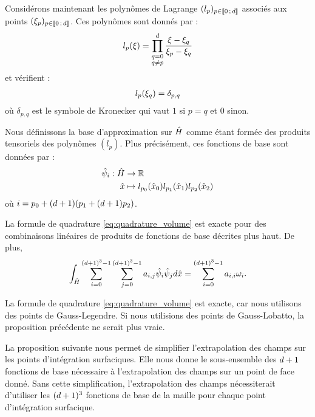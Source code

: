 Considérons maintenant les polynômes de Lagrange $(l_p)_{p \in \lbrack\!\lbrack0\,;\,d\rbrack\!\rbrack}$
associés aux points $(\xi_p)_{p \in \lbrack\!\lbrack0\,;\,d\rbrack\!\rbrack}$.
Ces polynômes sont donnés par :
\begin{align}
	l_p(\xi) = \prod_{\substack{q=0 \\ q \ne p}}^{d}
	\frac{\xi - \xi_q}{\xi_p - \xi_q}
\end{align}
et vérifient :
\begin{align}
	l_p(\xi_q) = \delta_{p,q}
\end{align}
où $\delta_{p,q}$ est le symbole de Kronecker qui vaut $1$ si $p = q$
et $0$ sinon.


Nous définissons la base d’approximation sur $\hat{H}$ comme étant formée des
produits tensoriels des polynômes $(l_p)$. Plus précisément, ces fonctions
de base sont données par :
\begin{equation}
	\begin{aligned}
		\hat{\psi}_{i} : \hat{H} &\to \mathbb{R} \\
		\hat{x} &\mapsto
		l_{p_{0}}(\hat{x}_0)
		l_{p_{1}}(\hat{x}_1)
		l_{p_{2}}(\hat{x}_2)
	\end{aligned}
\end{equation}
où $i = {p_{0}} + (d + 1)({p_{1}} + (d + 1){p_{2}})$.

\begin{proposition}
	La formule de quadrature \eqref{eq:quadrature_volume} est exacte pour des
	combinaisons linéaires de produits de fonctions de base décrites plus haut.
	De plus,
	\begin{align}
		\int_{\hat{H}} \sum_{i=0}^{(d + 1)^3 - 1} \sum_{j=0}^{(d + 1)^3 - 1}
		a_{i,j} \hat{\psi}_{i} \hat{\psi}_{j} d\hat{x} =
		\sum_{i=0}^{(d + 1)^3 - 1} a_{i,i} \omega_{i} .
	\end{align}
\end{proposition}

\begin{remark}
	La formule de quadrature \eqref{eq:quadrature_volume} est exacte, car nous
	utilisons des points de Gauss-Legendre. Si nous utilisions des points de
	Gauss-Lobatto, la proposition précédente ne serait plus vraie.
\end{remark}

La proposition suivante nous permet de simplifier l’extrapolation des
champs sur les points d’intégration surfaciques. Elle nous donne
le sous-ensemble des $d + 1$ fonctions de base nécessaire à
l'extrapolation des champs sur un point de face donné.
Sans cette simplification, l’extrapolation des champs nécessiterait
d'utiliser les $(d + 1)^3$ fonctions de base de la maille pour chaque
point d’intégration surfacique.

